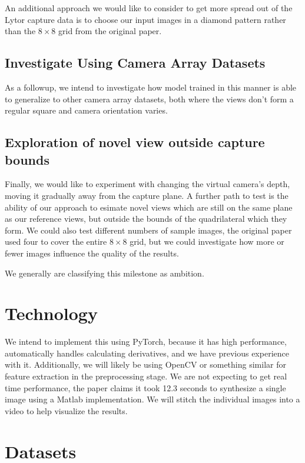\documentclass[10pt,twocolumn,letterpaper]{article}
\begin{document}
An additional approach we would like to consider to get more spread out of the Lytor capture data
is to choose our input images in a diamond pattern rather than the $8 \times 8$ grid from the original
paper.

\subsection{Investigate Using Camera Array Datasets}

As a followup, we intend to investigate how model trained in this manner is
able to generalize to other camera array datasets, both where the views don't form
a regular square and camera orientation varies.

\subsection{Exploration of novel view outside capture bounds}

Finally, we would like to experiment with changing the virtual camera's depth, moving it gradually
away from the capture plane. A further path to test is the ability of our approach to esimate novel
views which are still on the same plane as our reference views, but outside the bounds of the
quadrilateral which they form. We could also test different numbers of sample images, the original
paper used four to cover the entire $8 \times 8$ grid, but we could investigate how more or fewer images
influence the quality of the results. 

We generally are classifying this milestone as ambition.

\section{Technology}

We intend to implement this using PyTorch, because it has high performance, 
automatically handles calculating derivatives, and we have previous experience with it.
Additionally, we will likely be using OpenCV or something similar for feature extraction
in the preprocessing stage.
We are not expecting to get real time performance, the paper claims it took 12.3 seconds to synthesize
a single image using a Matlab implementation. We will stitch the individual images into a video to
help visualize the results.

\section{Datasets}
\end{document}
